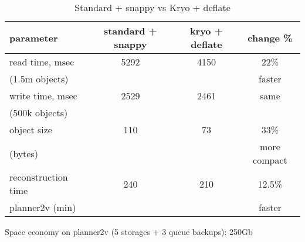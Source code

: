 \documentclass[8pt]{beamer}
\begin{document}
\subsection{\partname}
\begin{frame}[fragile]{\partname}

  \begin{table}
    \begin{tabular}{l | c | c | c }
      parameter       & standard + snappy & kryo + deflate & change \% \\
      \hline \hline
      read time, msec & 5292              & 4150           & 22\%   \\
      (1.5m objects)  &                   &                & faster \\
      \hline
      write time, msec& 2529              & 2461           & same   \\
      (500k objects)  &                   &                &        \\
      \hline
      object size     & 110               & 73             & 33\% \\
      (bytes)         &                   &                & more compact \\
      \hline
      reconstruction time  & 240          & 210            & 12.5\% \\
      planner2v (min)      &              &                & faster \\
      \hline
    \end{tabular}
    \caption{Standard + snappy vs Kryo + deflate}
  \end{table}

  Space economy on planner2v (5 storages + 3 queue backups): 250Gb

\end{frame}

\renewcommand{\partname}{Choice}
\end{document}
